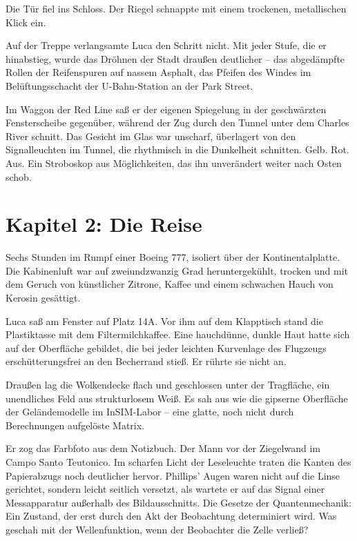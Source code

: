 \documentclass[
  ngerman,
]{article}
\begin{document}
Die Tür fiel ins Schloss. Der Riegel schnappte mit einem trockenen,
metallischen Klick ein.

Auf der Treppe verlangsamte Luca den Schritt nicht. Mit jeder Stufe, die
er hinabstieg, wurde das Dröhnen der Stadt draußen deutlicher -- das
abgedämpfte Rollen der Reifenspuren auf nassem Asphalt, das Pfeifen des
Windes im Belüftungsschacht der U-Bahn-Station an der Park Street.

Im Waggon der Red Line saß er der eigenen Spiegelung in der geschwärzten
Fensterscheibe gegenüber, während der Zug durch den Tunnel unter dem
Charles River schnitt. Das Gesicht im Glas war unscharf, überlagert von
den Signalleuchten im Tunnel, die rhythmisch in die Dunkelheit
schnitten. Gelb. Rot. Aus. Ein Stroboskop aus Möglichkeiten, das ihn
unverändert weiter nach Osten schob.

\section{\texorpdfstring{\textbf{Kapitel 2: Die
Reise}}{Kapitel 2: Die Reise}}\label{kapitel-2-die-reise}

Sechs Stunden im Rumpf einer Boeing 777, isoliert über der
Kontinentalplatte. Die Kabinenluft war auf zweiundzwanzig Grad
heruntergekühlt, trocken und mit dem Geruch von künstlicher Zitrone,
Kaffee und einem schwachen Hauch von Kerosin gesättigt.

Luca saß am Fenster auf Platz 14A. Vor ihm auf dem Klapptisch stand die
Plastiktasse mit dem Filtermilchkaffee. Eine hauchdünne, dunkle Haut
hatte sich auf der Oberfläche gebildet, die bei jeder leichten
Kurvenlage des Flugzeugs erschütterungsfrei an den Becherrand stieß. Er
rührte sie nicht an.

Draußen lag die Wolkendecke flach und geschlossen unter der Tragfläche,
ein unendliches Feld aus strukturlosem Weiß. Es sah aus wie die gipserne
Oberfläche der Geländemodelle im InSIM-Labor -- eine glatte, noch nicht
durch Berechnungen aufgelöste Matrix.

Er zog das Farbfoto aus dem Notizbuch. Der Mann vor der Ziegelwand im
Campo Santo Teutonico. Im scharfen Licht der Leseleuchte traten die
Kanten des Papierabzugs noch deutlicher hervor. Phillips' Augen waren
nicht auf die Linse gerichtet, sondern leicht seitlich versetzt, als
wartete er auf das Signal einer Messapparatur außerhalb des
Bildausschnitts. Die Gesetze der Quantenmechanik: Ein Zustand, der erst
durch den Akt der Beobachtung determiniert wird. Was geschah mit der
Wellenfunktion, wenn der Beobachter die Zelle verließ?
\end{document}

